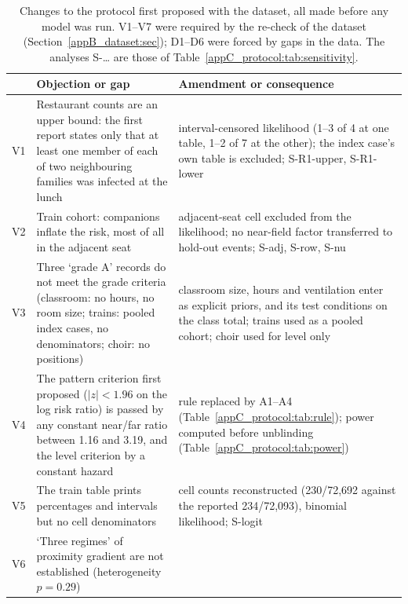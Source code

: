 \begin{table}[tbp]
  \centering\footnotesize
  \caption{Changes to the protocol first proposed with the dataset, all made before any model was run. V1--V7
  were required by the re-check of the dataset (Section~\ref{appB_dataset:sec}); D1--D6 were forced by
  gaps in the data. The analyses S-\dots{} are those of Table~\ref{appC_protocol:tab:sensitivity}.}
  \label{appC_protocol:tab:amend}
  \begin{tabular}{@{}l>{\raggedright\arraybackslash}p{}>{\raggedright\arraybackslash}p{}@{}}
    \toprule
    & Objection or gap & Amendment or consequence \\
    \midrule
    V1 & Restaurant counts are an upper bound: the first report states only that at least one member of each
         of two neighbouring families was infected at the lunch \citep{lu2020} &
         interval-censored likelihood (1--3 of 4 at one table, 1--2 of 7 at the other); the index case's own
         table is excluded; S-R1-upper, S-R1-lower \\
    V2 & Train cohort: companions inflate the risk, most of all in the adjacent seat \citep{hu2021} &
         adjacent-seat cell excluded from the likelihood; no near-field factor transferred to hold-out
         events; S-adj, S-row, S-nu \\
    V3 & Three `grade A' records do not meet the grade criteria (classroom: no hours, no room size; trains:
         pooled index cases, no denominators; choir: no positions) &
         classroom size, hours and ventilation enter as explicit priors, and its test conditions on the class
         total; trains used as a pooled cohort; choir used for level only \\
    V4 & The pattern criterion first proposed ($|z|<1.96$ on the log risk ratio) is passed by any constant near/far
         ratio between 1.16 and 3.19, and the level criterion by a constant hazard &
         rule replaced by A1--A4 (Table~\ref{appC_protocol:tab:rule}); power computed before unblinding
         (Table~\ref{appC_protocol:tab:power}) \\
    V5 & The train table prints percentages and intervals but no cell denominators &
         cell counts reconstructed (230/72{,}692 against the reported 234/72{,}093), binomial likelihood;
         S-logit \\
    V6 & `Three regimes' of proximity gradient are not established (heterogeneity $p=0.29$) &

\end{tabular}
\end{table}
